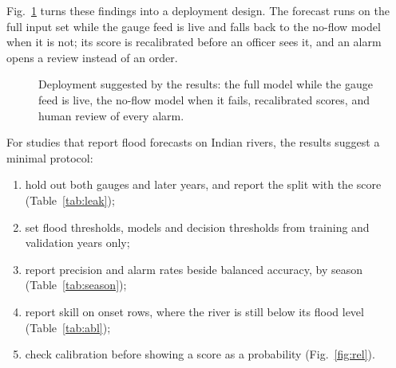 \documentclass[conference]{IEEEtran}
\begin{document}
Fig.~\ref{fig:deploy} turns these findings into a deployment design. The forecast runs on the full input set while the gauge feed is live and falls back to the no-flow model when it is not; its score is recalibrated before an officer sees it, and an alarm opens a review instead of an order.

\begin{figure}[t]
\centering
{}
\caption{Deployment suggested by the results: the full model while the gauge feed is live, the no-flow model when it fails, recalibrated scores, and human review of every alarm.}
\label{fig:deploy}
\end{figure}

For studies that report flood forecasts on Indian rivers, the results suggest a minimal protocol:
\begin{enumerate}
\item hold out both gauges and later years, and report the split with the score (Table~\ref{tab:leak});
\item set flood thresholds, models and decision thresholds from training and validation years only;
\item report precision and alarm rates beside balanced accuracy, by season (Table~\ref{tab:season});
\item report skill on onset rows, where the river is still below its flood level (Table~\ref{tab:abl});
\item check calibration before showing a score as a probability (Fig.~\ref{fig:rel}).
\end{enumerate}
\end{document}

